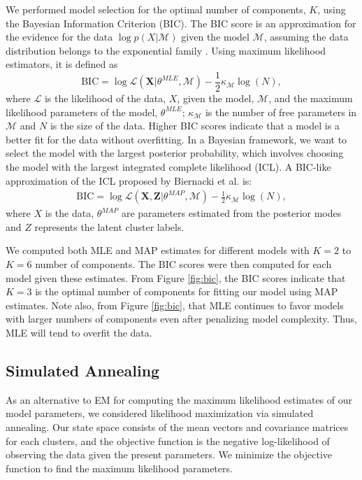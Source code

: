 \documentclass[twoside]{article}
\theoremstyle{theorem}
\theoremstyle{theorem}
\theoremstyle{theorem}
\theoremstyle{lemma}
\theoremstyle{definition}
\theoremstyle{example}
\begin{document}
We performed model selection for the optimal number of components, $K$, using the Bayesian Information Criterion (BIC). The BIC score is an approximation for the evidence for the data $\log p(X | \mathcal{M})$ given the model $\mathcal{M}$, assuming the data distribution belongs to the exponential family \cite{Bishop}. Using maximum likelihood estimators, it is defined as 
\begin{equation}
\mathrm{BIC} = \log\mathcal{L}(\mathbf{X} | \theta^{MLE}, \mathcal{M}) - \frac{1}{2} \kappa_\mathcal{M}  \log(N),
\end{equation}
where $\mathcal{L}$ is the likelihood of the data, $X$, given the model, $\mathcal{M}$, and the maximum likelihood parameters of the model, $\theta^{MLE}$; $\kappa_\mathcal{M}$ is the number of free parameters in $\mathcal{M}$ and $N$ is the size of the data. Higher BIC scores indicate that a model is a better fit for the data without overfitting. In a Bayesian framework, we want to select the model with the largest posterior probability, which involves choosing the model with the largest integrated complete likelihood (ICL). A BIC-like approximation of the ICL proposed by Biernacki et al. \cite{Biernacki} is: 
\begin{align}
\mathrm{BIC} = \log \mathcal{L}(\mathbf{X}, \mathbf{Z} | \theta^{MAP},  \mathcal{M}) -  \frac{1}{2} \kappa_\mathcal{M} \log(N),
\end{align}
where $X$ is the data, $\theta^{MAP}$ are parameters estimated from the posterior modes and $Z$ represents the latent cluster labels. 

We computed both MLE and MAP estimates for different models with $K=2$ to $K=6$ number of components. The BIC scores were then computed for each model given these estimates. From Figure \ref{fig:bic}, the BIC scores indicate that $K = 3$ is the optimal number of components for fitting our model using MAP estimates. Note also, from Figure \ref{fig:bic}, that MLE continues to favor models with larger numbers of components even after penalizing model complexity. Thus, MLE will tend to overfit the data.

\subsection{Simulated Annealing}
As an alternative to EM for computing the maximum likelihood estimates of our model parameters, we considered likelihood maximization via simulated annealing.  Our state space consists of the mean vectors and covariance matrices for each clusters, and the objective function is the negative log-likelihood of observing the data given the present parameters. We minimize the objective function to find the maximum likelihood parameters.
\end{document}
